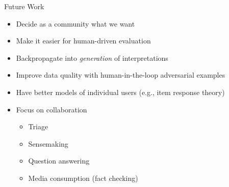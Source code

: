 \documentclass[compress]{beamer}
\begin{document}
\begin{frame}{Future Work}

  \begin{itemize}
  \item Decide as a community what we want
  \item Make it easier for human-driven evaluation
    \item Backpropagate into \emph{generation} of interpretations
    \item Improve data quality with human-in-the-loop adversarial examples
    \item Have better models of individual users (e.g., item response
      theory)
    \item Focus on collaboration
      \begin{itemize}
      \item Triage
      \item Sensemaking
      \item Question answering
        \item Media consumption (fact checking)
      \end{itemize}
  \end{itemize}

\end{frame}
\end{document}
